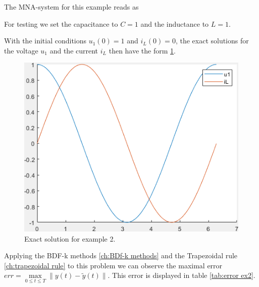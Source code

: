 	The MNA-system for this example reads as
	
	For testing we set the capacitance to $C=1$ and the inductance to $L=1$.
	
	With the initial conditions $u_1(0) = 1$ and $i_L(0) = 0$, the exact solutions for the voltage $u_1$ and the current $i_L$ then have the form \ref{fig: Exact solution for example 2}.	
	
	\begin{figure}[H]
		\label{fig: Exact solution for example 2}
		\centering
		\includegraphics[scale=0.7]{pictures/exact_solution_ex2.png}
		\caption{Exact solution for example 2.}
	\end{figure}
	
	Applying the BDF-k methods \ref{ch:BDf-k methods} and the Trapezoidal rule \ref{ch:trapezoidal rule} to this problem we can observe the maximal error $err = \max\limits_{0 \leq t \leq T} \| y(t) - \tilde{y}(t) \|$. This error is displayed in table \ref{tab:error ex2}.
	
	
	\begin{table}[H]
	\end{table}
	
